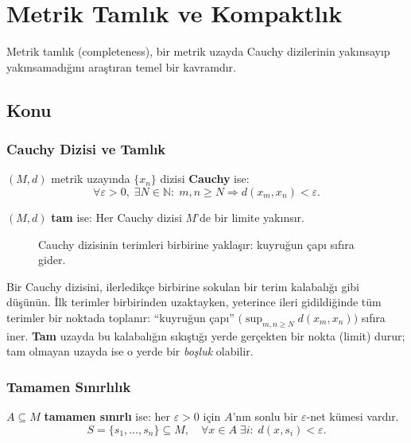 \chapter{Metrik Tamlık ve Kompaktlık}

Metrik tamlık (completeness), bir metrik uzayda Cauchy dizilerinin yakınsayıp
yakınsamadığını araştıran temel bir kavramdır.

\section{Konu}

\subsection{Cauchy Dizisi ve Tamlık}

\begin{definition}
$(M, d)$ metrik uzayında $\{x_n\}$ dizisi \textbf{Cauchy} ise:
\[
\forall\varepsilon>0,\;\exists N \in \mathbb{N}:\;
m,n \geq N \Rightarrow d(x_m, x_n) < \varepsilon.
\]
\end{definition}

\begin{definition}
$(M, d)$ \textbf{tam} ise: Her Cauchy dizisi $M$'de bir limite yakınsır.
\end{definition}

\begin{figure}[ht]
\centering

\caption{Cauchy dizisinin terimleri birbirine yaklaşır: kuyruğun çapı sıfıra gider.}
\end{figure}

\begin{sezgi}
Bir Cauchy dizisini, ilerledikçe birbirine sokulan bir terim kalabalığı gibi
düşünün. İlk terimler birbirinden uzaktayken, yeterince ileri gidildiğinde tüm
terimler bir noktada toplanır: ``kuyruğun çapı''
$\bigl(\sup_{m,n\geq N} d(x_m, x_n)\bigr)$ sıfıra iner. \textbf{Tam} uzayda bu
kalabalığın sıkıştığı yerde gerçekten bir nokta (limit) durur; tam olmayan
uzayda ise o yerde bir \emph{boşluk} olabilir.
\end{sezgi}

\subsection{Tamamen Sınırlılık}

$A \subseteq M$ \textbf{tamamen sınırlı} ise: her $\varepsilon>0$ için $A$'nın
sonlu bir $\varepsilon$-net kümesi vardır.
\[
S = \{s_1,\ldots,s_n\} \subseteq M,\quad
\forall x \in A\;\exists i:\; d(x, s_i) < \varepsilon.
\]

